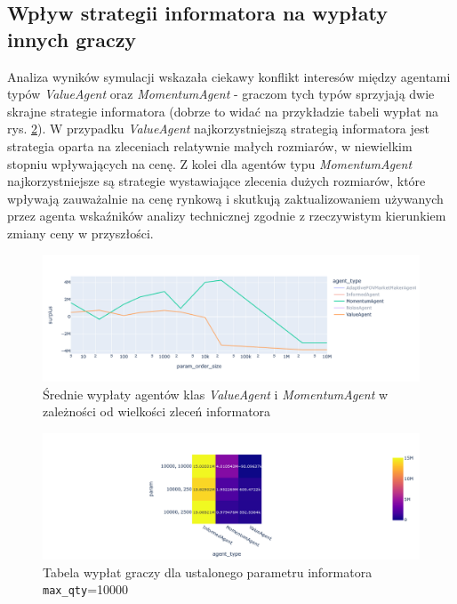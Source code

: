 \subsection{Wpływ strategii informatora na wypłaty innych graczy}
Analiza wyników symulacji wskazała ciekawy konflikt interesów między agentami typów \textit{ValueAgent} oraz \textit{MomentumAgent} - graczom tych typów sprzyjają dwie skrajne strategie informatora (dobrze to widać na przykładzie tabeli wypłat na rys. \ref{fig:gametab}). W przypadku \textit{ValueAgent} najkorzystniejszą strategią informatora jest strategia oparta na zleceniach relatywnie małych rozmiarów, w niewielkim stopniu wpływających na cenę. Z kolei dla agentów typu \textit{MomentumAgent} najkorzystniejsze są strategie wystawiające zlecenia dużych rozmiarów, które wpływają zauważalnie na cenę rynkową i skutkują zaktualizowaniem używanych przez agenta wskaźników analizy technicznej zgodnie z rzeczywistym kierunkiem zmiany ceny w przyszłości. 
\begin{center}
\begin{figure}
\begin{center}
\includegraphics[scale=0.4]{ordersize.png}
\end{center}
\caption{Średnie wypłaty agentów klas \textit{ValueAgent} i \textit{MomentumAgent} w zależności od wielkości zleceń informatora}\label{fig:ordersnum}
\end{figure}
\end{center}
\begin{center}
\begin{figure}
\begin{center}
\includegraphics[scale=0.4]{table.png}
\end{center}
\caption{Tabela wypłat graczy dla ustalonego parametru informatora \texttt{max\_qty}=10000}\label{fig:gametab}
\end{figure}
\end{center}
